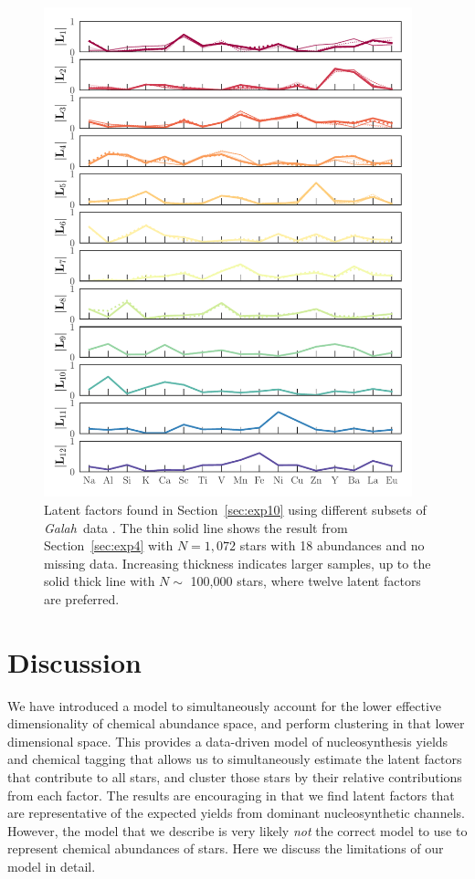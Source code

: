 \documentclass[twocolumn]{aastex62}
\newcommand{\project}[1]{\textsl{#1}}
\newcommand{\Galah}{\project{Galah}}
\begin{document}
\begin{figure}[t!]
	\includegraphics[width=0.95\textwidth]{experiments/exp10-comparison.pdf}
	\caption{Latent factors found in Section~\ref{sec:exp10} using different subsets
	         of \Galah\ data \citep{Buder:2018}. The thin solid line shows the result from
	         Section~\ref{sec:exp4} with $N=1,072$ stars with 18 abundances and no
	         missing data. Increasing thickness indicates larger samples, up to the solid thick line with $N \sim$ 100,000 stars, where twelve latent factors are preferred.}
    \label{fig:exp10-comparison}
\end{figure}


\vspace{1em}
\section{Discussion} \label{sec:discussion}

We have introduced a model to simultaneously account for the lower
effective dimensionality of chemical abundance space, and perform clustering
in that lower dimensional space. This provides a data-driven model of
nucleosynthesis yields and chemical tagging that allows us to simultaneously
estimate the latent factors that contribute to all stars, and cluster those 
stars by their relative contributions from each factor. The results are
encouraging in that we find latent factors that are representative of the
expected yields from dominant nucleosynthetic channels. However, the model that
we describe is very likely \emph{not} the correct model to use to represent 
chemical abundances of stars. Here we discuss the limitations of our model 
in detail.
\end{document}
